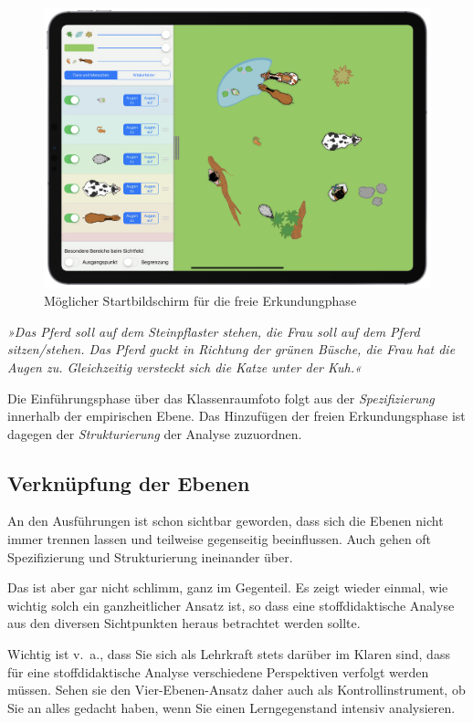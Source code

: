 \documentclass[
  ngerman,
]{scrbook}
\theoremstyle{definition}
\theoremstyle{definition}
\theoremstyle{definition}
\theoremstyle{definition}
\theoremstyle{remark}
\begin{document}
\begin{figure}

{\centering \includegraphics[width=0.75\linewidth]{pictures/2-WinkelfarmStart} 

}

\caption{Möglicher Startbildschirm für die freie Erkundungphase}\label{fig:WinkelfarmStart}
\end{figure}

\emph{»Das Pferd soll auf dem Steinpflaster stehen, die Frau soll auf dem Pferd sitzen/stehen. Das Pferd guckt in Richtung der grünen Büsche, die Frau hat die Augen zu. Gleichzeitig versteckt sich die Katze unter der Kuh.«}

Die Einführungsphase über das Klassenraumfoto folgt aus der \emph{Spezifizierung} innerhalb der empirischen Ebene. Das Hinzufügen der freien Erkundungsphase ist dagegen der \emph{Strukturierung} der Analyse zuzuordnen.

\hypertarget{verknuxfcpfung-der-ebenen}{%
\subsection{Verknüpfung der Ebenen}\label{verknuxfcpfung-der-ebenen}}

An den Ausführungen ist schon sichtbar geworden, dass sich die Ebenen nicht immer trennen lassen und teilweise gegenseitig beeinflussen. Auch gehen oft Spezifizierung und Strukturierung ineinander über.

Das ist aber gar nicht schlimm, ganz im Gegenteil. Es zeigt wieder einmal, wie wichtig solch ein ganzheitlicher Ansatz ist, so dass eine stoffdidaktische Analyse aus den diversen Sichtpunkten heraus betrachtet werden sollte.

Wichtig ist v.~a., dass Sie sich als Lehrkraft stets darüber im Klaren sind, dass für eine stoffdidaktische Analyse verschiedene Perspektiven verfolgt werden müssen. Sehen sie den Vier-Ebenen-Ansatz daher auch als Kontrollinstrument, ob Sie an alles gedacht haben, wenn Sie einen Lerngegenstand intensiv analysieren.
\end{document}
